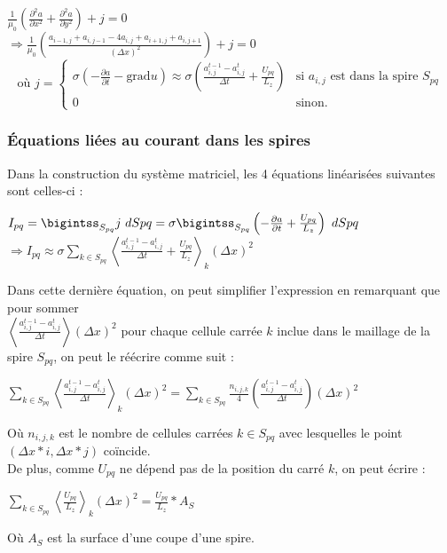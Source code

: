 \documentclass[11pt]{article}
\begin{document}
\begin{center}
    $\frac{1}{\mu_0} \left( \frac{\partial^2a}{\partial x^2} + \frac{\partial^2a}{\partial y^2} \right) + j = 0$ \\
    $\Longrightarrow \frac{1}{\mu_0} \left(\frac{a_{i-1,j} + a_{i,j-1} - 4a_{i,j} + a_{i+1,j} + a_{i,j+1}}{ \left(\Delta x\right)^2} \right) + j = 0 $ 
    $$ \textrm{où }
    j = \left\{
        \begin{array}{ll}
            \sigma \left( - \frac{\partial a}{\partial t} - \mbox{grad}u\right) \approx \sigma \left(\frac{a_{i,j}^{t-1} - a_{i,j}^t}{\Delta t} + \frac{U_{pq}}{L_z} \right) & \mbox{si } a_{i,j} \mbox{ est dans la spire } S_{pq} \\
            0 & \mbox{sinon.}
        \end{array}
    \right.
    $$
\end{center}

\subsubsection{Équations liées au courant dans les spires}
Dans la construction du système matriciel, les 4 équations linéarisées suivantes sont celles-ci :
\begin{center}
    $I_{pq} = \bigintss_{S_{pq}}j~dS{pq} = \sigma\bigintss_{S_{pq}} \left(-\frac{\partial a}{\partial t} + \frac{U_{pq}}{L_z} \right)~dS{pq}$ \\
    $\Longrightarrow I_{pq} \approx \sigma \underset{k\in S_{pq}}{\sum} \left< \frac{a_{i,j}^{t-1} - a_{i,j}^t}{\Delta t} + \frac{U_{pq}}{L_z}\right>_k \left(\Delta x\right)^2 $ \\
\end{center}
Dans cette dernière équation, on peut simplifier l'expression en remarquant que pour sommer \\ $\left<\frac{a_{i,j}^{t-1} - a_{i,j}^t}{\Delta t}\right>\left(\Delta x\right)^2$ pour chaque cellule carrée $k$ inclue dans le maillage de la spire $S_{pq}$, on peut le réécrire comme suit :
\begin{center}
    $\underset{k\in S_{pq}}{\sum} \left< \frac{a_{i,j}^{t-1} - a_{i,j}^t}{\Delta t}\right>_k \left(\Delta x\right)^2= \underset{k\in S_{pq}}{\sum} \frac{n_{i,j,k}}{4}\left(\frac{ a_{i,j}^{t-1} - a_{i,j}^t}{\Delta t} \right)\left(\Delta x\right)^2$
\end{center}
Où $n_{i,j,k} $ est le nombre de cellules carrées $k \in S_{pq}$ avec lesquelles le point $(\Delta x*i,\Delta x*j)$ coïncide.\\
De plus, comme $U_{pq}$ ne dépend pas de la position du carré $k$, on peut écrire :
\begin{center}
    $\underset{k\in S_{pq}}{\sum} \left< \frac{U_{pq}}{L_z}\right>_k\left(\Delta x\right)^2 = \frac{U_{pq}}{L_z} * A_S$
\end{center}
Où $A_S$ est la surface d'une coupe d'une spire.
\end{document}
